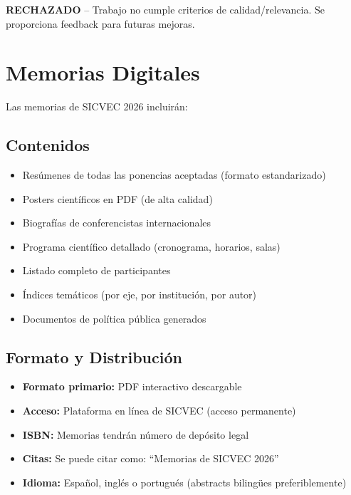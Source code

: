 \documentclass[12pt,a4paper]{article}
\begin{document}
\begin{tcolorbox}[enhanced, colback=red!10, colframe=rojo, boxrule=1pt, left=10pt, right=10pt, top=8pt, bottom=8pt]
\textbf{RECHAZADO} -- Trabajo no cumple criterios de calidad/relevancia. Se proporciona feedback para futuras mejoras.
\end{tcolorbox}

\section{Memorias Digitales}

Las memorias de SICVEC 2026 incluirán:

\subsection{Contenidos}

\begin{itemize}[label={\textcolor{verdemid}{\textbullet}}]
  \item Resúmenes de todas las ponencias aceptadas (formato estandarizado)
  \item Posters científicos en PDF (de alta calidad)
  \item Biografías de conferencistas internacionales
  \item Programa científico detallado (cronograma, horarios, salas)
  \item Listado completo de participantes
  \item Índices temáticos (por eje, por institución, por autor)
  \item Documentos de política pública generados
\end{itemize}

\subsection{Formato y Distribución}

\begin{itemize}[label={\textcolor{verdemid}{\checkmark}}]
  \item \textbf{Formato primario:} PDF interactivo descargable
  \item \textbf{Acceso:} Plataforma en línea de SICVEC (acceso permanente)
  \item \textbf{ISBN:} Memorias tendrán número de depósito legal
  \item \textbf{Citas:} Se puede citar como: ``Memorias de SICVEC 2026''
  \item \textbf{Idioma:} Español, inglés o portugués (abstracts bilingües preferiblemente)
\end{itemize}
\end{document}
